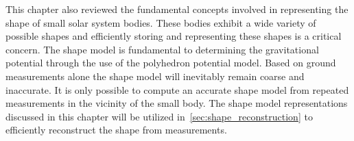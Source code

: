 This chapter also reviewed the fundamental concepts involved in representing the shape of small solar system bodies.
These bodies exhibit a wide variety of possible shapes and efficiently storing and representing these shapes is a critical concern.
The shape model is fundamental to determining the gravitational potential through the use of the polyhedron potential model.
Based on ground measurements alone the shape model will inevitably remain coarse and inaccurate.
It is only possible to compute an accurate shape model from repeated measurements in the vicinity of the small body.
The shape model representations discussed in this chapter will be utilized in~\cref{sec:shape_reconstruction} to efficiently reconstruct the shape from measurements.
